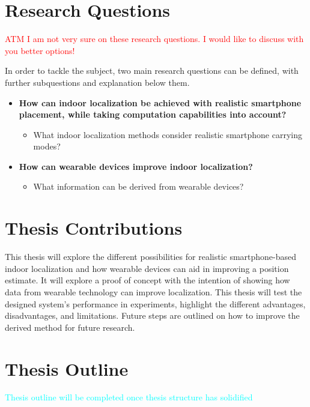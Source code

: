 

\section{Research Questions}
\textcolor{red}{ATM I am not very sure on these research questions. I would like to discuss with you better options!}

In order to tackle the subject, two main research questions can be defined, with further subquestions and explanation below them.

\begin{itemize}
	\item \textbf{How can indoor localization be achieved with realistic smartphone placement, while taking computation capabilities into account?}
	\begin{itemize}
		\item What indoor localization methods consider realistic smartphone carrying modes? 
	\end{itemize}
	\item\textbf{How can wearable devices improve indoor localization?}
	\begin{itemize}
		\item What information can be derived from wearable devices?
	\end{itemize}
\end{itemize}

\section{Thesis Contributions}
This thesis will explore the different possibilities for realistic smartphone-based indoor localization and how wearable devices can aid in improving a position estimate. It will explore a proof of concept with the intention of showing how data from wearable technology can improve localization. This thesis will test the designed system's performance in experiments, highlight the different advantages, disadvantages, and limitations. Future steps are outlined on how to improve the derived method for future research.

\section{Thesis Outline}
\textcolor{cyan}{Thesis outline will be completed once thesis structure has solidified}